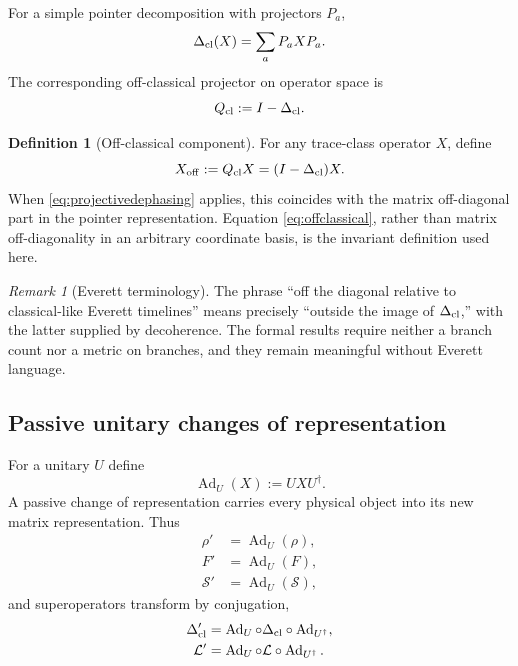 \documentclass[11pt]{article}
\theoremstyle{definition}
\newtheorem{definition}[theorem]{Definition}
\theoremstyle{remark}
\newtheorem{remark}[theorem]{Remark}
\newcommand{\Ad}{\operatorname{Ad}}
\begin{document}
For a simple pointer decomposition with projectors $P_a$,
\begin{equation}
 \Delta_{\rm cl}(X)=\sum_a P_a X P_a.
 \label{eq:projectivedephasing}
\end{equation}
The corresponding off-classical projector on operator space is
\begin{equation}
 Q_{\rm cl}:=I-\Delta_{\rm cl}.
 \label{eq:Q}
\end{equation}

\begin{definition}[Off-classical component]
For any trace-class operator $X$, define
\begin{equation}
 X_{\rm off}:=Q_{\rm cl}X=(I-\Delta_{\rm cl})X.
 \label{eq:offclassical}
\end{equation}
When \eqref{eq:projectivedephasing} applies, this coincides with the matrix off-diagonal part in the pointer representation. Equation \eqref{eq:offclassical}, rather than matrix off-diagonality in an arbitrary coordinate basis, is the invariant definition used here.
\end{definition}

\begin{remark}[Everett terminology]
The phrase ``off the diagonal relative to classical-like Everett timelines'' means precisely ``outside the image of $\Delta_{\rm cl}$,'' with the latter supplied by decoherence. The formal results require neither a branch count nor a metric on branches, and they remain meaningful without Everett language.
\end{remark}

\subsection{Passive unitary changes of representation}
For a unitary $U$ define
\begin{equation}
 \Ad_U(X):=UXU^\dagger.
\end{equation}
A passive change of representation carries every physical object into its new matrix representation. Thus
\begin{align}
 \rho'&=\Ad_U(\rho),\\
 F'&=\Ad_U(F),\\
 \mathcal S'&=\Ad_U(\mathcal S),
 \label{eq:basictransforms}
\end{align}
and superoperators transform by conjugation,
\begin{align}
 \Delta_{\rm cl}'
 &=\Ad_U\circ\Delta_{\rm cl}\circ\Ad_{U^\dagger},
 \label{eq:deltatransform}\\
 \mathcal L'
 &=\Ad_U\circ\mathcal L\circ\Ad_{U^\dagger}.
 \label{eq:Ltransform}
\end{align}
\end{document}
